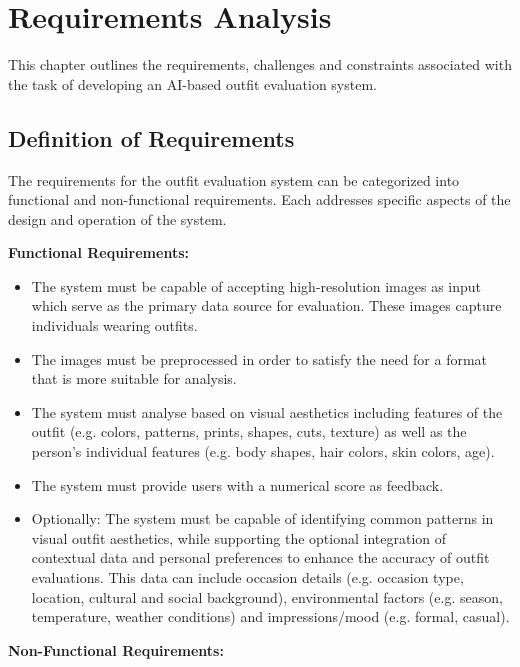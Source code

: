 \chapter{Requirements Analysis}

This chapter outlines the requirements, challenges and constraints associated with the task of developing an \acs{AI}-based outfit evaluation system.

\section{Definition of Requirements}

The requirements for the outfit evaluation system can be categorized into functional and non-functional requirements. Each addresses specific aspects of the design and operation of the system.

\vspace{0.5cm}

\textbf{Functional Requirements:}

\begin{itemize}
  \item The system must be capable of accepting high-resolution images as input which serve as the primary data source for evaluation. These images capture individuals wearing outfits.
  \item The images must be preprocessed in order to satisfy the need for a format that is more suitable for analysis.
  \item The system must analyse based on visual aesthetics including features of the outfit (e.g. colors, patterns, prints, shapes, cuts, texture) as well as the person's individual features (e.g. body shapes, hair colors, skin colors, age).
  \item The system must provide users with a numerical score as feedback.
  \item Optionally: The system must be capable of identifying common patterns in visual outfit aesthetics, while supporting the optional integration of contextual data and personal preferences to enhance the accuracy of outfit evaluations. This data can include occasion details (e.g. occasion type, location, cultural and social background), environmental factors (e.g. season, temperature, weather conditions) and impressions/mood (e.g. formal, casual).
\end{itemize}

\newpage

\textbf{Non-Functional Requirements:}


